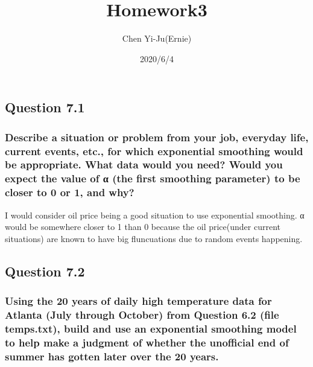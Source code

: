 \documentclass[
]{article}
\title{Homework3}
\author{Chen Yi-Ju(Ernie)}
\date{2020/6/4}
\begin{document}
\maketitle

\hypertarget{question-7.1}{%
\subsection{Question 7.1}\label{question-7.1}}

\hypertarget{describe-a-situation-or-problem-from-your-job-everyday-life-current-events-etc.-for-which-exponential-smoothing-would-be-appropriate.-what-data-would-you-need-would-you-expect-the-value-of-ux3b1-the-first-smoothing-parameter-to-be-closer-to-0-or-1-and-why}{%
\subsubsection{Describe a situation or problem from your job, everyday
life, current events, etc., for which exponential smoothing would be
appropriate. What data would you need? Would you expect the value of α
(the first smoothing parameter) to be closer to 0 or 1, and
why?}\label{describe-a-situation-or-problem-from-your-job-everyday-life-current-events-etc.-for-which-exponential-smoothing-would-be-appropriate.-what-data-would-you-need-would-you-expect-the-value-of-ux3b1-the-first-smoothing-parameter-to-be-closer-to-0-or-1-and-why}}

I would consider oil price being a good situation to use exponential
smoothing. α would be somewhere closer to 1 than 0 because the oil
price(under current situations) are known to have big fluncuations due
to random events happening.

\hypertarget{question-7.2}{%
\subsection{Question 7.2}\label{question-7.2}}

\hypertarget{using-the-20-years-of-daily-high-temperature-data-for-atlanta-july-through-october-from-question-6.2-file-temps.txt-build-and-use-an-exponential-smoothing-model-to-help-make-a-judgment-of-whether-the-unofficial-end-of-summer-has-gotten-later-over-the-20-years.}{%
\subsubsection{Using the 20 years of daily high temperature data for
Atlanta (July through October) from Question 6.2 (file temps.txt), build
and use an exponential smoothing model to help make a judgment of
whether the unofficial end of summer has gotten later over the 20
years.}\label{using-the-20-years-of-daily-high-temperature-data-for-atlanta-july-through-october-from-question-6.2-file-temps.txt-build-and-use-an-exponential-smoothing-model-to-help-make-a-judgment-of-whether-the-unofficial-end-of-summer-has-gotten-later-over-the-20-years.}}
\end{document}
